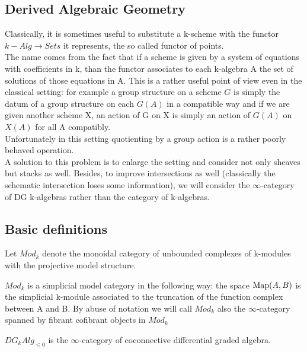 \begin{refsection}
\section{Derived Algebraic Geometry}

Classically, it is sometimes useful to substitute a k-scheme with the functor $k-Alg\to Sets$ it represents, the so called functor of points.\\
The name comes from the fact that if a scheme is given by a system of equations with coefficients in k, than the functor associates to each k-algebra A the set
of solutions of those equations in A. This is a rather useful point of view even in the classical setting: for example a group structure on a scheme $G$
is simply the datum of a group structure on each $G(A)$ in a compatible way and if we are given another scheme X, an action of G on X is simply an
action of $G(A)$ on $X(A)$ for all A compatibly.\\
Unfortunately in this setting quotienting by a group action is a rather poorly behaved operation.\\
A solution to this problem is to enlarge the setting and consider not only sheaves but stacks as well. Besides, to improve intersections as well (classically the schematic
intersection loses some information), we will consider the $\infty$-category of DG k-algebras rather than the category of k-algebras.\\

\subsection{Basic definitions}

\begin{defin}
Let $Mod_k$ denote the monoidal category of unbounded complexes of k-modules with the projective model structure.
\end{defin}

\begin{prop}
$Mod_k$ is a simplicial model category in the following way: the space $\mathrm{Map}(A,B)$ is the simplicial k-module associated to the truncation of the function complex between
A and B. By abuse of notation we will call $Mod_k$ also the $\infty$-category spanned by fibrant cofibrant objects in $Mod_k$
\end{prop}

\begin{defin}
$DG_kAlg_{\le 0}$ is the $\infty$-category of coconnective differential graded algebra.
\end{defin}


\end{refsection}
